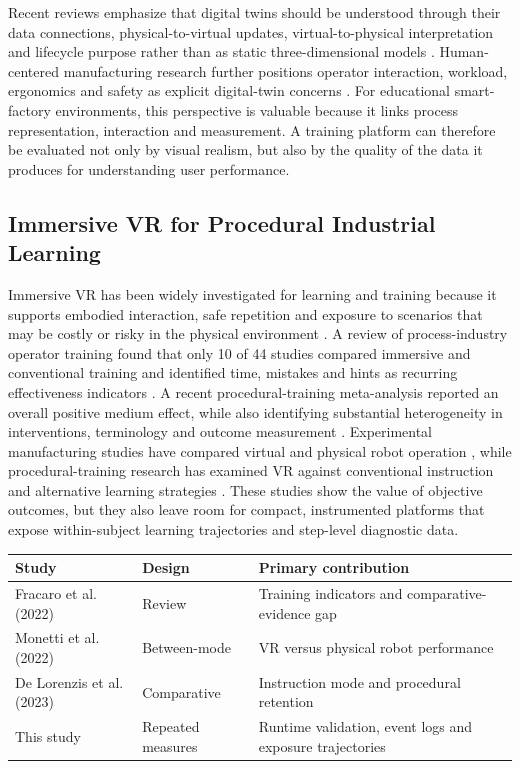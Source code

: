 \documentclass[a4paper,twoside]{article}
\begin{document}
Recent reviews emphasize that digital twins should be understood through their data connections, physical-to-virtual updates, virtual-to-physical interpretation and lifecycle purpose rather than as static three-dimensional models \cite{Jones2020,Rasheed2020,Thelen2022}. Human-centered manufacturing research further positions operator interaction, workload, ergonomics and safety as explicit digital-twin concerns \cite{Wilhelm2021,Berti2022}. For educational smart-factory environments, this perspective is valuable because it links process representation, interaction and measurement. A training platform can therefore be evaluated not only by visual realism, but also by the quality of the data it produces for understanding user performance.

\subsection{Immersive VR for Procedural Industrial Learning}

Immersive VR has been widely investigated for learning and training because it supports embodied interaction, safe repetition and exposure to scenarios that may be costly or risky in the physical environment \cite{Radianti2020,Radhakrishnan2021,Tusher2024}. A review of process-industry operator training found that only 10 of 44 studies compared immersive and conventional training and identified time, mistakes and hints as recurring effectiveness indicators \cite{Fracaro2022}. A recent procedural-training meta-analysis reported an overall positive medium effect, while also identifying substantial heterogeneity in interventions, terminology and outcome measurement \cite{Jongbloed2024}. Experimental manufacturing studies have compared virtual and physical robot operation \cite{Monetti2022}, while procedural-training research has examined VR against conventional instruction and alternative learning strategies \cite{DeLorenzis2023}. These studies show the value of objective outcomes, but they also leave room for compact, instrumented platforms that expose within-subject learning trajectories and step-level diagnostic data.

\begin{center}
\centering
{}
\label{tab:positioning}
\scriptsize
\setlength{\tabcolsep}{3pt}
\renewcommand{\arraystretch}{1.18}
\vspace{1mm}
\begin{tabular}{p{1.45cm}p{1.25cm}p{2.55cm}}
\hline
\textbf{Study} & \textbf{Design} & \textbf{Primary contribution}\\
\hline
Fracaro et al. (2022) & Review & Training indicators and comparative-evidence gap\\
\hline
Monetti et al. (2022) & Between-mode & VR versus physical robot performance\\
\hline
De Lorenzis et al. (2023) & Comparative & Instruction mode and procedural retention\\
\hline
This study & Repeated measures & Runtime validation, event logs and exposure trajectories\\
\hline
\end{tabular}
\end{center}
\end{document}
